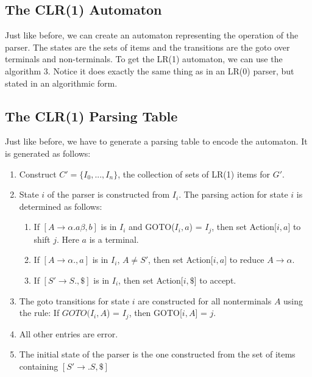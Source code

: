 \documentclass[12pt,letterpaper]{book}
\theoremstyle{definition}
\begin{document}
\subsection{The CLR(1) Automaton}

Just like before, we can create an automaton representing the operation of the parser. The states are the sets of items and the transitions are the goto over terminals and non-terminals. To get the LR(1) automaton, we can use the algorithm 3. Notice it does exactly the same thing as in an LR(0) parser, but stated in an algorithmic form.


\subsection{The CLR(1) Parsing Table}

Just like before, we have to generate a parsing table to encode the automaton. It is generated as follows:

\begin{enumerate}
  \item Construct $C' = \{I_0,...,I_n\}$, the collection of sets of LR(1) items for $G'$.
  \item State $i$ of the parser is constructed from $I_i$. The parsing action for state $i$ is determined as follows:
    \begin{enumerate}
      \item If $[A \rightarrow \alpha . a \beta, b]$ is in $I_i$ and GOTO($I_i,a$) = $I_j$, then set Action[$i,a$] to shift $j$. Here $a$ is a terminal.
      \item If $[A \rightarrow \alpha ., a]$ is in $I_i$, $A \neq S'$, then set Action[$i,a$] to reduce $A \rightarrow \alpha$.
      \item If $[S' \rightarrow S . , \$]$ is in $I_i$, then set Action[$i,\$$] to accept.
    \end{enumerate}
  \item The goto transitions for state $i$ are constructed for all nonterminals $A$ using the rule: If $GOTO(I_i,A$) = $I_j$, then GOTO[$i,A$] = $j$.
  \item All other entries are error.
  \item The initial state of the parser is the one constructed from the set of items containing $[S' \rightarrow .S,\$]$
\end{enumerate}
\end{document}
